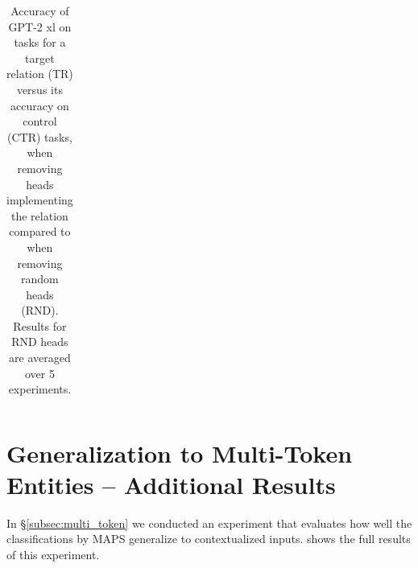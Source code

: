 \documentclass[11pt]{article}
\newcommand{\GPTxl}{GPT-2 xl}
\newcommand{\framework}{\textsc{MAPS}}
\begin{document}
\begin{table}[p]
\begin{tabular}{lrrrrrrr}
\bottomrule
\end{tabular}

\caption{Accuracy of \GPTxl{} on tasks for a target relation (TR) versus its accuracy on control (CTR) tasks, when removing heads implementing the relation compared to when removing random heads (RND). Results for RND heads are averaged over 5 experiments.
} 
\label{tab:causal_results_gpt_xl}
\end{table}




\section{Generalization to Multi-Token Entities -- Additional Results}
\label{appendix:contextualization_extended}
In \S\ref{subsec:multi_token} we conducted an experiment that evaluates how well the classifications by \framework{} generalize to contextualized inputs.
 shows the full results of this experiment.
\end{document}
